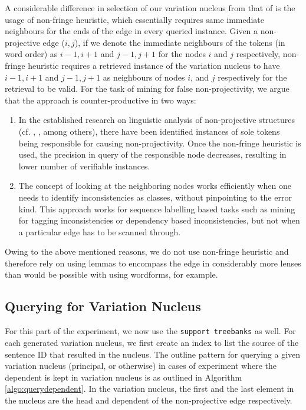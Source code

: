 A considerable difference in selection of our variation nucleus from that of \citeauthor{boyd} is the usage of non-fringe heuristic, which essentially requires same immediate neighbours for the ends of the edge in every queried instance. Given a non-projective edge (\(i,j\)), if we denote the immediate neighbours of the tokens (in word order) as \(i-1, i+1\) and \(j-1, j+1\) for the nodes \(i\) and \(j\) respectively, non-fringe heuristic requires a retrieved instance of the variation nucleus to have \(i-1, i+1\) and \(j-1, j+1\) as neighbours of nodes \(i\), and \(j\) respectively for the retrieval to be valid. For the task of mining for false non-projectivity, we argue that the approach is counter-productive in two ways:
\begin{enumerate}
    \item In the established research on linguistic analysis of non-projective structures (cf. \citep{mambriniNonProj}, \citep{indic-riyaz}, among others), there have been identified instances of sole tokens being responsible for causing non-projectivity. Once the non-fringe heuristic is used, the precision in query of the responsible node decreases, resulting in lower number of verifiable instances.
    \item The concept of looking at the neighboring nodes works efficiently when one needs to identify inconsistencies as classes, without pinpointing to the error kind. This approach works for sequence labelling based tasks such as mining for tagging inconsistencies or dependency based inconsistencies, but not when a particular edge has to be scanned through.
\end{enumerate}

Owing to the above mentioned reasons, we do not use non-fringe heuristic and therefore rely on using lemmas to encompass the edge in considerably more lenses than would be possible with using wordforms, for example.

\subsection{Querying for Variation Nucleus}

For this part of the experiment, we now use the \texttt{support treebanks} as well. For each generated variation nucleus, we first create an index to list the source of the sentence ID that resulted in the nucleus. The outline pattern for querying a given variation nucleus (principal, or otherwise) in cases of experiment where the dependent is kept in variation nucleus is as outlined in Algorithm \ref{algo:querydependent}. In the variation nucleus, the first and the last element in the nucleus are the head and dependent of the non-projective edge respectively.

